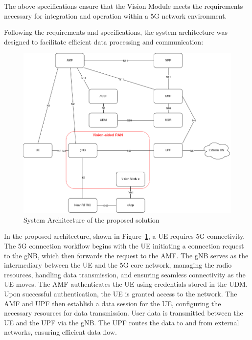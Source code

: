 \begin{table}[H]
\caption{Specifications}
\label{tab:spec}
\centering
{}
\end{table}

The above specifications ensure that the Vision Module meets the requirements necessary for integration and operation within a 5G network environment.


Following the requirements and specifications, the system architecture was designed to facilitate efficient data processing and communication:

\begin{figure}[H]
    \centering
    \includegraphics[width=0.7\linewidth]{figures/Syst_Arch.drawio}
    \caption[System Architecture of the proposed solution]{System Architecture of the proposed solution}
    \label{fig:my_arch}
\end{figure}

In the proposed architecture, shown in Figure~\ref{fig:my_arch}, a UE requires 5G connectivity.
The 5G connection workflow begins with the UE initiating a connection request to the gNB, which then forwards the request to the AMF\@.
The gNB serves as the intermediary between the UE and the 5G core network, managing the radio resources, handling data transmission, and ensuring seamless connectivity as the UE moves.
The AMF authenticates the UE using credentials stored in the UDM. Upon successful authentication, the UE is granted access to the network.
The AMF and UPF then establish a data session for the UE, configuring the necessary resources for data transmission.
User data is transmitted between the UE and the UPF via the gNB\@.
The UPF routes the data to and from external networks, ensuring efficient data flow.

